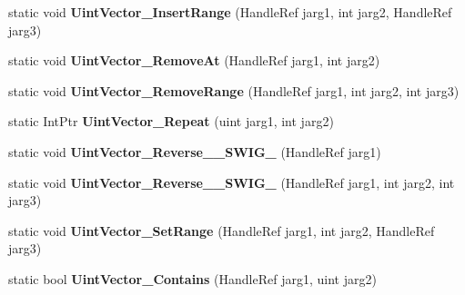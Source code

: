 \begin{DoxyCompactItemize}
\item 
\hypertarget{class_assimp_p_i_n_v_o_k_e_a8e5d158a98c8655f2d8419e21e051163}{static void {\bfseries Uint\+Vector\+\_\+\+Insert\+Range} (Handle\+Ref jarg1, int jarg2, Handle\+Ref jarg3)}\label{class_assimp_p_i_n_v_o_k_e_a8e5d158a98c8655f2d8419e21e051163}

\item 
\hypertarget{class_assimp_p_i_n_v_o_k_e_a1f116bd2c7cc728b0fcb78bb7ca7257d}{static void {\bfseries Uint\+Vector\+\_\+\+Remove\+At} (Handle\+Ref jarg1, int jarg2)}\label{class_assimp_p_i_n_v_o_k_e_a1f116bd2c7cc728b0fcb78bb7ca7257d}

\item 
\hypertarget{class_assimp_p_i_n_v_o_k_e_ad46a0fa6adec9d011bb31c53ac163573}{static void {\bfseries Uint\+Vector\+\_\+\+Remove\+Range} (Handle\+Ref jarg1, int jarg2, int jarg3)}\label{class_assimp_p_i_n_v_o_k_e_ad46a0fa6adec9d011bb31c53ac163573}

\item 
\hypertarget{class_assimp_p_i_n_v_o_k_e_a3522f2b0317fd527e8fa302ff52f304d}{static Int\+Ptr {\bfseries Uint\+Vector\+\_\+\+Repeat} (uint jarg1, int jarg2)}\label{class_assimp_p_i_n_v_o_k_e_a3522f2b0317fd527e8fa302ff52f304d}

\item 
\hypertarget{class_assimp_p_i_n_v_o_k_e_af5a751c6a0d9303ca06037c9dfa3bb6e}{static void {\bfseries Uint\+Vector\+\_\+\+Reverse\+\_\+\+\_\+\+S\+W\+I\+G\+\_} (Handle\+Ref jarg1)}\label{class_assimp_p_i_n_v_o_k_e_af5a751c6a0d9303ca06037c9dfa3bb6e}

\item 
\hypertarget{class_assimp_p_i_n_v_o_k_e_aef1189a3f86fc66153b123d032b5e731}{static void {\bfseries Uint\+Vector\+\_\+\+Reverse\+\_\+\+\_\+\+S\+W\+I\+G\+\_} (Handle\+Ref jarg1, int jarg2, int jarg3)}\label{class_assimp_p_i_n_v_o_k_e_aef1189a3f86fc66153b123d032b5e731}

\item 
\hypertarget{class_assimp_p_i_n_v_o_k_e_a9357c2282f580e953c27e50f03ccd314}{static void {\bfseries Uint\+Vector\+\_\+\+Set\+Range} (Handle\+Ref jarg1, int jarg2, Handle\+Ref jarg3)}\label{class_assimp_p_i_n_v_o_k_e_a9357c2282f580e953c27e50f03ccd314}

\item 
\hypertarget{class_assimp_p_i_n_v_o_k_e_ae5d722a9f8ef187b5f27f80cd66f2239}{static bool {\bfseries Uint\+Vector\+\_\+\+Contains} (Handle\+Ref jarg1, uint jarg2)}\label{class_assimp_p_i_n_v_o_k_e_ae5d722a9f8ef187b5f27f80cd66f2239}


\end{DoxyCompactItemize}

